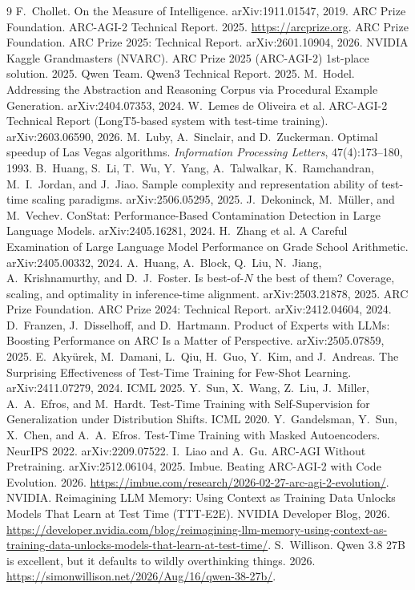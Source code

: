 \documentclass[11pt]{article}
\begin{document}
\begin{thebibliography}{9}
 F.~Chollet. On the Measure of Intelligence. arXiv:1911.01547, 2019.
 ARC Prize Foundation. ARC-AGI-2 Technical Report. 2025. \url{https://arcprize.org}.
 ARC Prize Foundation. ARC Prize 2025: Technical Report. arXiv:2601.10904, 2026.
 NVIDIA Kaggle Grandmasters (NVARC). ARC Prize 2025 (ARC-AGI-2) 1st-place solution. 2025.
 Qwen Team. Qwen3 Technical Report. 2025.
 M.~Hodel. Addressing the Abstraction and Reasoning Corpus via Procedural Example
Generation. arXiv:2404.07353, 2024.
 W.~Lemes de Oliveira et al. ARC-AGI-2 Technical Report (LongT5-based system with
test-time training). arXiv:2603.06590, 2026.
 M.~Luby, A.~Sinclair, and D.~Zuckerman. Optimal speedup of Las Vegas algorithms.
\emph{Information Processing Letters}, 47(4):173--180, 1993.
 B.~Huang, S.~Li, T.~Wu, Y.~Yang, A.~Talwalkar, K.~Ramchandran,
M.~I.~Jordan, and J.~Jiao. Sample complexity and representation ability of test-time scaling paradigms.
arXiv:2506.05295, 2025.
 J.~Dekoninck, M.~Müller, and M.~Vechev. ConStat: Performance-Based Contamination
Detection in Large Language Models. arXiv:2405.16281, 2024.
 H.~Zhang et al. A Careful Examination of Large Language Model Performance on Grade
School Arithmetic. arXiv:2405.00332, 2024.
 A.~Huang, A.~Block, Q.~Liu, N.~Jiang, A.~Krishnamurthy, and D.~J.~Foster. Is
best-of-$N$ the best of them? Coverage, scaling, and optimality in inference-time alignment.
arXiv:2503.21878, 2025.
 ARC Prize Foundation. ARC Prize 2024: Technical Report. arXiv:2412.04604, 2024.
 D.~Franzen, J.~Disselhoff, and D.~Hartmann. Product of Experts with LLMs:
Boosting Performance on ARC Is a Matter of Perspective. arXiv:2505.07859, 2025.
 E.~Akyürek, M.~Damani, L.~Qiu, H.~Guo, Y.~Kim, and J.~Andreas. The Surprising
Effectiveness of Test-Time Training for Few-Shot Learning. arXiv:2411.07279, 2024. ICML 2025.
 Y.~Sun, X.~Wang, Z.~Liu, J.~Miller, A.~A.~Efros, and M.~Hardt. Test-Time Training
with Self-Supervision for Generalization under Distribution Shifts. ICML 2020.
 Y.~Gandelsman, Y.~Sun, X.~Chen, and A.~A.~Efros. Test-Time Training with Masked
Autoencoders. NeurIPS 2022. arXiv:2209.07522.
 I.~Liao and A.~Gu. ARC-AGI Without Pretraining. arXiv:2512.06104, 2025.
 Imbue. Beating ARC-AGI-2 with Code Evolution. 2026.
\url{https://imbue.com/research/2026-02-27-arc-agi-2-evolution/}.
 NVIDIA. Reimagining LLM Memory: Using Context as Training Data Unlocks Models That
Learn at Test Time (TTT-E2E). NVIDIA Developer Blog, 2026.
\url{https://developer.nvidia.com/blog/reimagining-llm-memory-using-context-as-training-data-unlocks-models-that-learn-at-test-time/}.
 S.~Willison. Qwen 3.8 27B is excellent, but it defaults to
wildly overthinking things. 2026. \url{https://simonwillison.net/2026/Aug/16/qwen-38-27b/}.
\end{thebibliography}
\end{document}
